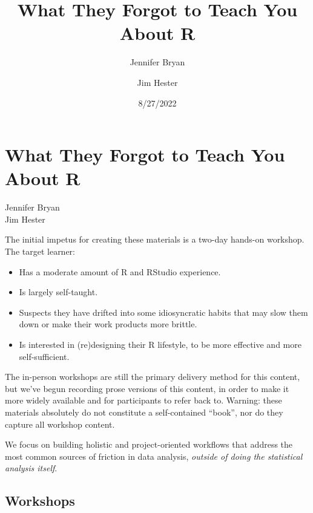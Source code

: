 \documentclass[
  letterpaper,
]{book}
\title{What They Forgot to Teach You About R}
\author{Jennifer Bryan \and Jim Hester}
\date{8/27/2022}
\providecommand{\tightlist}{%
  \setlength{\itemsep}{0pt}\setlength{\parskip}{0pt}}\usepackage{longtable,booktabs,array}
\renewcommand*\contentsname{Table of contents}
\newcommand\contentsname{Table of contents}
\begin{document}
\frontmatter
\maketitle
\ifdefined\Shaded\renewenvironment{Shaded}{\begin{tcolorbox}[sharp corners, enhanced, interior hidden, breakable, borderline west={3pt}{0pt}{shadecolor}, frame hidden, boxrule=0pt]}{\end{tcolorbox}}\fi

\renewcommand*\contentsname{Table of contents}
{
\setcounter{tocdepth}{2}
\tableofcontents
}
\mainmatter
{}

\hypertarget{what-they-forgot-to-teach-you-about-r}{%
\chapter{What They Forgot to Teach You About
R}\label{what-they-forgot-to-teach-you-about-r}}

Jennifer Bryan\\
Jim Hester

\hfill\break

The initial impetus for creating these materials is a two-day hands-on
workshop. The target learner:

\begin{itemize}
\tightlist
\item
  Has a moderate amount of R and RStudio experience.
\item
  Is largely self-taught.
\item
  Suspects they have drifted into some idiosyncratic habits that may
  slow them down or make their work products more brittle.
\item
  Is interested in (re)designing their R lifestyle, to be more effective
  and more self-sufficient.
\end{itemize}

The in-person workshops are still the primary delivery method for this
content, but we've begun recording prose versions of this content, in
order to make it more widely available and for participants to refer
back to. Warning: these materials absolutely do not constitute a
self-contained ``book'', nor do they capture all workshop content.

We focus on building holistic and project-oriented workflows that
address the most common sources of friction in data analysis,
\emph{outside of doing the statistical analysis itself}.

\hypertarget{workshops}{%
\section*{Workshops}\label{workshops}}
\end{document}
